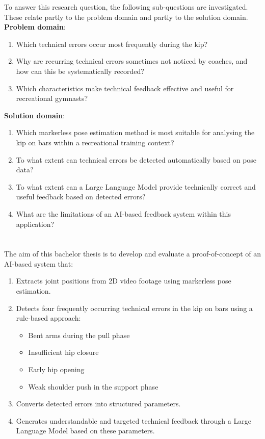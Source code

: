 To answer this research question, the following sub-questions are investigated. These relate partly to the problem domain and partly to the solution domain.
\newline
\textbf{Problem domain}:

\begin{enumerate}
    \item Which technical errors occur most frequently during the kip?
    \item Why are recurring technical errors sometimes not noticed by coaches, and how can this be systematically recorded?
    \item Which characteristics make technical feedback effective and useful for recreational gymnasts?
\end{enumerate}

\textbf{Solution domain}:

\begin{enumerate}
    \item Which markerless pose estimation method is most suitable for analysing the kip on bars within a recreational training context?
    \item To what extent can technical errors be detected automatically based on pose data?
    \item To what extent can a Large Language Model provide technically correct and useful feedback based on detected errors?
    \item What are the limitations of an AI-based feedback system within this application?
\end{enumerate}

\section{}%
\label{sec:onderzoeksdoelstelling}

The aim of this bachelor thesis is to develop and evaluate a proof-of-concept of an AI-based system that:

\begin{enumerate}
    \item Extracts joint positions from 2D video footage using markerless pose estimation.
    \item Detects four frequently occurring technical errors in the kip on bars using a rule-based approach:
    \begin{itemize}
        \item Bent arms during the pull phase
        \item Insufficient hip closure
        \item Early hip opening
        \item Weak shoulder push in the support phase
    \end{itemize}
    \item Converts detected errors into structured parameters.
    \item Generates understandable and targeted technical feedback through a Large Language Model based on these parameters.
\end{enumerate}

